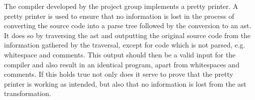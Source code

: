 The compiler developed by the project group implements a pretty printer.
A pretty printer is used to ensure that no information is lost in the process of converting the source code into a parse tree followed by the conversion to an \acrshort{ast}.
It does so by traversing the \acrshort{ast} and outputting the original source code from the information gathered by the traversal, except for code which is not parsed, e.g. whitespace and comments.
This output should then be a valid input for the compiler and also result in an identical program, apart from whitespaces and comments.
If this holds true not only does it serve to prove that the pretty printer is working as intended, but also that no information is lost from the \acrshort{ast} transformation.